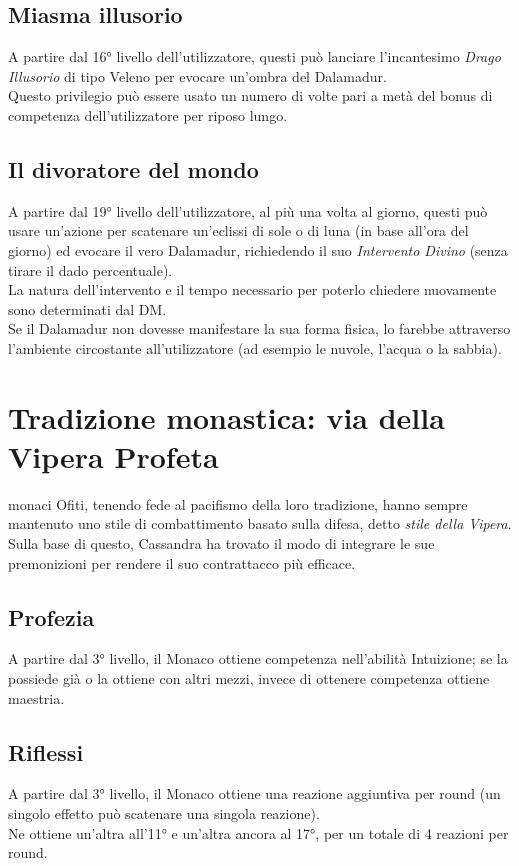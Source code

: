 \documentclass[letterpaper,twocolumn,openany,nodeprecatedcode]{dndbook}
\begin{document}
\subsection{Miasma illusorio}
A partire dal 16° livello dell'utilizzatore, questi può lanciare l'incantesimo \textit{Drago Illusorio} di tipo Veleno per evocare un'ombra del Dalamadur.\\
Questo privilegio può essere usato un numero di volte pari a metà del bonus di competenza dell'utilizzatore per riposo lungo.

\subsection{Il divoratore del mondo}
A partire dal 19° livello dell'utilizzatore, al più una volta al giorno, questi può usare un'azione per scatenare un'eclissi di sole o di luna (in base all'ora del giorno) ed evocare il vero Dalamadur, richiedendo il suo \textit{Intervento Divino} (senza tirare il dado percentuale).\\
La natura dell'intervento e il tempo necessario per poterlo chiedere nuovamente sono determinati dal DM.\\
Se il Dalamadur non dovesse manifestare la sua forma fisica, lo farebbe attraverso l'ambiente circostante all'utilizzatore (ad esempio le nuvole, l'acqua o la sabbia).

\section{Tradizione monastica: via della Vipera Profeta}
 monaci Ofiti, tenendo fede al pacifismo della loro tradizione, hanno sempre mantenuto uno stile di combattimento basato sulla difesa, detto \textit{stile della Vipera}. Sulla base di questo, Cassandra ha trovato il modo di integrare le sue premonizioni per rendere il suo contrattacco più efficace.

\subsection{Profezia}
A partire dal 3° livello, il Monaco ottiene competenza nell'abilità Intuizione; se la possiede già o la ottiene con altri mezzi, invece di ottenere competenza ottiene maestria.

\subsection{Riflessi}
A partire dal 3° livello, il Monaco ottiene una reazione aggiuntiva per round (un singolo effetto può scatenare una singola reazione).\\
Ne ottiene un'altra all'11° e un'altra ancora al 17°, per un totale di 4 reazioni per round.
\end{document}
